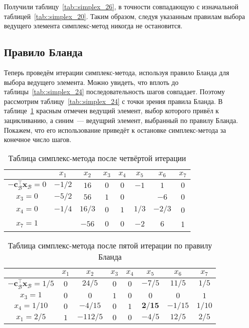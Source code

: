 \documentclass[12pt]{article}
\newcommand{\bx}{\mathbf{x}}
\begin{document}
Получили таблицу~\ref{tab::simplex_26}, в точности совпадающую с изначальной таблицей~\ref{tab::simplex_20}. 
Таким образом, следуя указанным правилам выбора ведущего элемента симплекс-метод никогда не остановится.

\subsection{Правило Бланда}

Теперь проведём итерации симплекс-метода, используя правило Бланда для выбора ведущего элемента.
Можно увидеть, что вплоть до таблицы~\ref{tab::simplex_24} последовательность шагов совпадает.
Поэтому рассмотрим таблицу~\ref{tab::simplex_24} с точки зрения правила Бланда.
В таблице~\ref{tab::simplex_24_2} красным отмечен ведущий элемент, выбор которого привёл к зацикливанию, а синим~--- ведущрий элемент, выбранный по правилу Бланда.
Покажем, что его использование приведёт к остановке симплекс-метода за конечное число шагов.

\begin{table}[!ht]
\centering
\caption{Таблица симплекс-метода после четвёртой итерации}
\begin{tabular}{|c|ccccccc|}
\hline
& $x_1$ & $x_2$ & $x_3$ & $x_4$ & $x_5$ & $x_6$ & $x_7$\\
\hline
$-\mathbf{c}_{\mathcal{B}}^{\top}\bx_{\mathcal{B}} = 0$ & $-1/2$ & $16$ & $0$ & $0$ & $-1$ & $1$ & $0$ \\
\hline
$x_3 = 0$ & $-5/2$ & $56$ & $1$ & $0$ & {\color{red}{$\mathbf{2}$}} & $-6$ & $0$ \\
$x_4 = 0$ & $-1/4$ & $16/3$ & $0$ & $1$ & $1/3$ & $-2/3$ & 0 \\
$x_7 = 1$ & {\color{blue}{$\mathbf{5/2}$}} & $-56$ & $0$ & $0$ & $-2$ & $6$ & 1 \\
\hline
\end{tabular}
\label{tab::simplex_24_2}
\end{table}

\begin{table}[!ht]
\centering
\caption{Таблица симплекс-метода после пятой итерации по правилу Бланда}
\begin{tabular}{|c|ccccccc|}
\hline
& $x_1$ & $x_2$ & $x_3$ & $x_4$ & $x_5$ & $x_6$ & $x_7$\\
\hline
$-\mathbf{c}_{\mathcal{B}}^{\top}\bx_{\mathcal{B}} = 1/5$ & $0$ & $24/5$ & $0$ & $0$ & $-7/5$ & $11/5$ & $1/5$ \\
\hline
$x_3 = 1$ & $0$ & $0$ & $1$ & $0$ & $0$ & $0$ & $1$ \\
$x_4 = 1/10$ & $0$ & $-4/15$ & $0$ & $1$ & $\mathbf{2/15}$ & $-1/15$ & $1/10$ \\
$x_1 = 2/5$ & $1$ & $-112/5$ & $0$ & $0$ & $-4/5$ & $12/5$ & $2/5$ \\
\hline
\end{tabular}
\label{tab::simplex_25_2}
\end{table}
\end{document}
